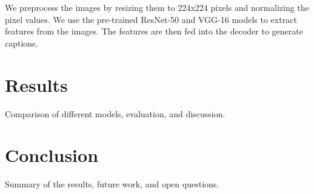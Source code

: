 \documentclass[12pt]{article}
\theoremstyle{plain}
\theoremstyle{definition}
\theoremstyle{remark}
\begin{document}
We preprocess the images by resizing them to 224x224 pixels and normalizing the pixel values. We use the pre-trained ResNet-50 and VGG-16 models to extract features from the images. The features are then fed into the decoder to generate captions.

\section{Results}
\label{sec:results}

Comparison of different models, evaluation, and discussion.

\section{Conclusion}
\label{sec:concl}

Summary of the results, future work, and open questions.



\newpage
\thispagestyle{empty}

\nocite{*}


\end{document}
